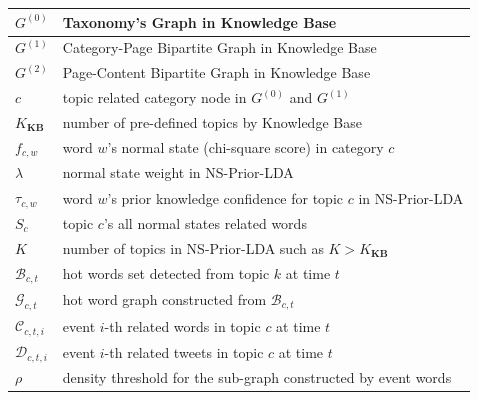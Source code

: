 \documentclass[11pt]{article}
\begin{document}
\begin{table}
\begin{tabular}{|p{}|p{}|} \hline
\(G^{(0)}\) & Taxonomy's Graph in Knowledge Base\\ \hline
\(G^{(1)}\) & Category-Page Bipartite Graph in Knowledge Base\\ \hline
\(G^{(2)}\) & Page-Content Bipartite Graph in Knowledge Base\\ \hline
\(c\) & topic related category node in \(G^{(0)}\) and \(G^{(1)}\) \\ \hline
\(K_{\bm{KB}}\) & number of pre-defined topics by Knowledge Base \\ \hline
\(f_{c,w}\) & word \(w\)'s normal state (chi-square score) in category \(c\) \\ \hline
\(\lambda\) & normal state weight in  NS-Prior-LDA\\ \hline
\(\tau_{c,w}\) & word \(w\)'s prior knowledge confidence for topic \(c\) in NS-Prior-LDA\\ \hline
\(S_c\) & topic \(c\)'s all normal states related words \\ \hline
\(K\) & number of topics in NS-Prior-LDA such as \(K>K_{\bm{KB}}\)\\ \hline
\(\mathcal{B}_{c, t}\)  & hot words set detected from topic \(k\) at time \(t\)  \\ \hline
\(\mathcal{G}_{c, t}\)  & hot word graph constructed from \(\mathcal{B}_{c, t}\) \\ \hline
\(\mathcal{C}_{c,t,i}\) & event \(i\)-th related words in topic \(c\) at time \(t\) \\ \hline
\(\mathcal{D}_{c,t,i}\) & event \(i\)-th related tweets in topic \(c\) at time \(t\) \\ \hline
\(\rho\) & density threshold for the sub-graph constructed by event words  \\ \hline

\end{tabular}
\label{symbolsInModel}
\end{table}
\end{document}
